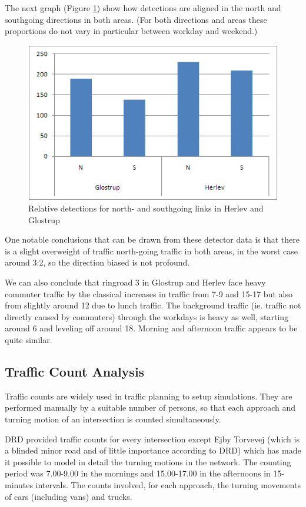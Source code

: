 The next graph (Figure \ref{fig:detector_directions}) show how detections are aligned in the north and southgoing directions in both areas. (For both directions and areas these proportions do not vary in particular between workday and weekend.)

\begin{figure}[!ht]
\centering
\includegraphics[scale=0.4]{detector_directions.png}
\caption{Relative detections for north- and southgoing links in Herlev and Glostrup}
\label{fig:detector_directions}
\end{figure}

One notable conclusions that can be drawn from these detector data is that there is a slight overweight of traffic north-going traffic in both areas, in the worst case around 3:2, so the direction biased is not profound.

We can also conclude that ringroad 3 in Glostrup and Herlev face heavy commuter traffic by the classical increases in traffic from 7-9 and 15-17 but also from slightly around 12 due to lunch traffic. The background traffic (ie. traffic not directly caused by commuters) through the workdays is heavy as well, starting around 6 and leveling off around 18. Morning and afternoon traffic appears to be quite similar.

\subsection{Traffic Count Analysis}
\label{traffic_count_analysis}

Traffic counts are widely used in traffic planning to setup simulations. They are performed manually by a suitable number of persons, so that each approach and turning motion of an intersection is counted simultaneously.

DRD provided traffic counts for every intersection except Ejby Torvevej (which is a blinded minor road and of little importance according to DRD) which has made it possible to model in detail the turning motions in the network.
The counting period was 7.00-9.00 in the mornings and 15.00-17.00 in the afternoons in 15-minutes intervals. The counts involved, for each approach, the turning movements of cars (including vans) and trucks. 


